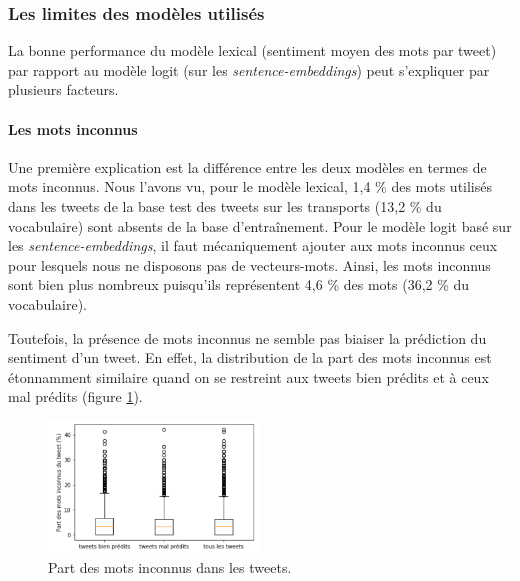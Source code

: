 \documentclass[11pt,french,french]{article}
\begin{document}
\subsubsection{Les limites des modèles
utilisés}\label{les-limites-des-moduxe8les-utilisuxe9s}

La bonne performance du modèle lexical (sentiment moyen des mots par
tweet) par rapport au modèle logit (sur les \emph{sentence-embeddings})
peut s'expliquer par plusieurs facteurs.

\paragraph{Les mots inconnus}\label{les-mots-inconnus}

Une première explication est la différence entre les deux modèles en
termes de mots inconnus. Nous l'avons vu, pour le modèle lexical, 1,4 \%
des mots utilisés dans les tweets de la base test des tweets sur les
transports (13,2 \% du vocabulaire) sont absents de la base
d'entraînement. Pour le modèle logit basé sur les
\emph{sentence-embeddings}, il faut mécaniquement ajouter aux mots
inconnus ceux pour lesquels nous ne disposons pas de vecteurs-mots.
Ainsi, les mots inconnus sont bien plus nombreux puisqu'ils représentent
4,6 \% des mots (36,2 \% du vocabulaire).

Toutefois, la présence de mots inconnus ne semble pas biaiser la
prédiction du sentiment d'un tweet. En effet, la distribution de la part
des mots inconnus est étonnamment similaire quand on se restreint aux
tweets bien prédits et à ceux mal prédits (figure
\ref{fig:mots_inconnus}).

\begin{figure}[ht]
\begin{center}
\includegraphics[width=0.5\textwidth]{img/mots_inconnus.png}
\captionsetup{margin=0cm,format=hang,justification=justified}
\caption{Part des mots inconnus dans les tweets.}\label{fig:mots_inconnus}
\end{center}
\end{figure}
\end{document}
